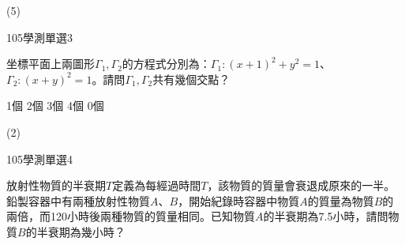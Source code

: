 \begin{QUESTIONS}
\begin{QUESTION}
        \begin{QTAGS}\end{QTAGS}
        \begin{QANS}
            (5)
        \end{QANS}
        \begin{QSOLLIST}
        \end{QSOLLIST}
        \begin{QEMPTYSPACE}
        \end{QEMPTYSPACE}
    \end{QUESTION}
    \begin{QUESTION}
        \begin{ExamInfo}{105}{學測}{單選}{3}
        \end{ExamInfo}
        \begin{ExamAnsRateInfo}{54}{77}{53}{32}
        \end{ExamAnsRateInfo}
        \begin{QBODY}
			坐標平面上兩圖形${{\Gamma }_{1}},{{\Gamma }_{2}}$的方程式分別為：${{\Gamma }_{1}}:{{(x+1)}^{2}}+{{y}^{2}}=1$、${{\Gamma }_{2}}:{{(x+y)}^{2}}=1$。請問${{\Gamma }_{1}},{{\Gamma }_{2}}$共有幾個交點？
			\begin{QOPS}
				\QOP 1個	
				\QOP 2個	
				\QOP 3個	
				\QOP 4個	
				\QOP 0個
			\end{QOPS}
        \end{QBODY}
        \begin{QFROMS}
        \end{QFROMS}
        \begin{QTAGS}\end{QTAGS}
        \begin{QANS}
            (2)
        \end{QANS}
        \begin{QSOLLIST}
        \end{QSOLLIST}
        \begin{QEMPTYSPACE}
        \end{QEMPTYSPACE}
    \end{QUESTION}
    \begin{QUESTION}
        \begin{ExamInfo}{105}{學測}{單選}{4}
        \end{ExamInfo}
        \begin{ExamAnsRateInfo}{54}{91}{55}{16}
        \end{ExamAnsRateInfo}
        \begin{QBODY}
			放射性物質的半衰期$T$定義為每經過時間$T$，該物質的質量會衰退成原來的一半。鉛製容器中有兩種放射性物質$A$、$B$，開始紀錄時容器中物質$A$的質量為物質$B$的兩倍，而120小時後兩種物質的質量相同。已知物質$A$的半衰期為7.5小時，請問物質$B$的半衰期為幾小時？

\end{QBODY}
\end{QUESTION}
\end{QUESTIONS}
